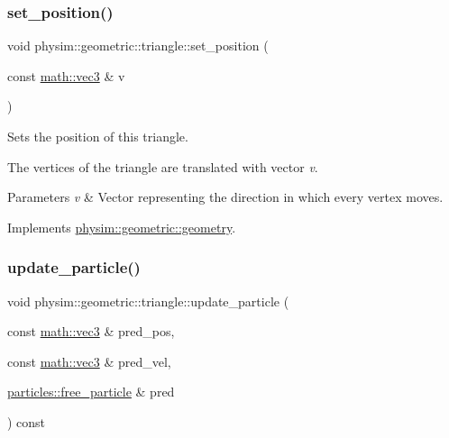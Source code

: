 \subsubsection{\texorpdfstring{set\+\_\+position()}{set\_position()}}
{\footnotesize\ttfamily void physim\+::geometric\+::triangle\+::set\+\_\+position (\begin{DoxyParamCaption}\item[{const \hyperlink{structphysim_1_1math_1_1vec3}{math\+::vec3} \&}]{v }\end{DoxyParamCaption})\hspace{0.3cm}{\ttfamily [virtual]}}



Sets the position of this triangle. 

The vertices of the triangle are translated with vector {\itshape v}. 
\begin{DoxyParams}{Parameters}
{\em v} & Vector representing the direction in which every vertex moves. \\
\hline
\end{DoxyParams}


Implements \hyperlink{classphysim_1_1geometric_1_1geometry_a5b029b5fa8e55847d5aa06b1d341c88c}{physim\+::geometric\+::geometry}.

\mbox{\label{classphysim_1_1geometric_1_1triangle_a3285ad4d763703ed84a21b25420c84bc}} 
\subsubsection{\texorpdfstring{update\+\_\+particle()}{update\_particle()}\hspace{0.1cm}{\footnotesize\ttfamily [1/2]}}
{\footnotesize\ttfamily void physim\+::geometric\+::triangle\+::update\+\_\+particle (\begin{DoxyParamCaption}\item[{const \hyperlink{structphysim_1_1math_1_1vec3}{math\+::vec3} \&}]{pred\+\_\+pos,  }\item[{const \hyperlink{structphysim_1_1math_1_1vec3}{math\+::vec3} \&}]{pred\+\_\+vel,  }\item[{\hyperlink{classphysim_1_1particles_1_1free__particle}{particles\+::free\+\_\+particle} \&}]{pred }\end{DoxyParamCaption}) const\hspace{0.3cm}{\ttfamily [virtual]}}



